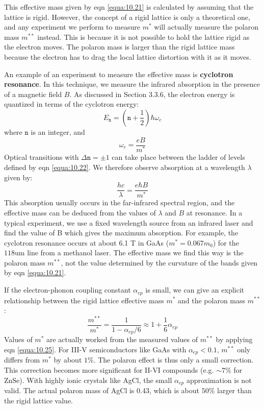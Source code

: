 \documentclass[12pt]{book}
\def\um{\mathrm{um}}
\begin{document}
This effective mass given by eqn \ref{equa:10.21} is calculated by assuming that the lattice is rigid. However, the concept of a rigid lattice is only a theoretical one, and any experiment we perform to measure $m^*$ will actually measure the polaron mass $m^{**}$ instead. This is because it is not possible to hold the lattice rigid as the electron moves. The polaron mass is larger than the rigid lattice mass because the electron has to drag the local lattice distortion with it as it moves.

An example of an experiment to measure the effective mass is \textbf{cyclotron resonance}. In this technique, we measure the infrared absorption in the presence of a magnetic field $B$. As discussed in Section 3.3.6, the electron energy is quantized in terms of the cyclotron energy:
\begin{equation}\label{equa:10.22}
  E_{\texttt{n}}=(\texttt{n}+\frac{1}{2})\hbar\omega_c
\end{equation}
where $\texttt{n}$ is an integer, and
\begin{equation}\label{equa:10.23}
  \omega_c=\frac{eB}{m^*}
\end{equation}
Optical transitions with $\Delta\texttt{n}=\pm1$ can take place between the ladder of levels defined by eqn \ref{equa:10.22}. We therefore observe absorption at a wavelength $\lambda$ given by:
\begin{equation}\label{equa:10.24}
  \frac{hc}{\lambda}=\frac{e\hbar B}{m^*}
\end{equation}
This absorption usually occurs in the far-infrared spectral region, and the effective mass can be deduced from the values of $\lambda$ and $B$ at resonance. In a typical experiment, we use a fixed wavelength source from an infrared laser and find the value of B which gives the maximum absorption. For example, the cyclotron resonance occurs at about 6.1 T in GaAs ($m^* = 0.067m_0$) for the $118\um$ line from a methanol laser. The effective mass we find this way is the polaron mass $m^{**}$, not the value determined by the curvature of the bands given by eqn \ref{equa:10.21}.

If the electron-phonon coupling constant $\alpha_{ep}$ is small, we can give an explicit relationship between the rigid lattice effective mass $m^*$ and the polaron mass $m^{**}$:
\begin{equation}\label{equa:10.25}
  \frac{m^{**}}{m^*}=\frac{1}{1-\alpha_{ep}/6}\approx1+\frac{1}{6}\alpha_{ep}
\end{equation}
Values of $m^*$ are actually worked from the measured values of $m^{**}$ by applying eqn \ref{equa:10.25}. For III-V semiconductors like GaAs with $\alpha_{ep}< 0.1$, $m^{**}$ only differs from $m^*$ by about $1\%$. The polaron effect is thus only a small correction. This correction becomes more significant for II-VI compounds (e.g. $\sim7\%$ for ZnSe). With highly ionic crystals like AgCl, the small $\alpha_{ep}$ approximation is not valid. The actual polaron mass of AgCl is 0.43, which is about $50\%$ larger than the rigid lattice value.
\end{document}
